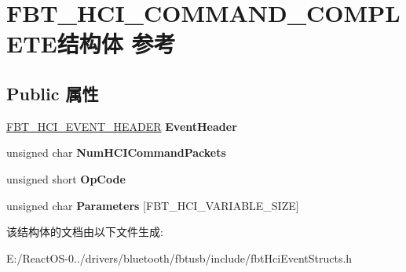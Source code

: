 \hypertarget{struct_f_b_t___h_c_i___c_o_m_m_a_n_d___c_o_m_p_l_e_t_e}{}\section{F\+B\+T\+\_\+\+H\+C\+I\+\_\+\+C\+O\+M\+M\+A\+N\+D\+\_\+\+C\+O\+M\+P\+L\+E\+T\+E结构体 参考}
\label{struct_f_b_t___h_c_i___c_o_m_m_a_n_d___c_o_m_p_l_e_t_e}
\subsection*{Public 属性}
\begin{DoxyCompactItemize}
\item 
\mbox{\label{struct_f_b_t___h_c_i___c_o_m_m_a_n_d___c_o_m_p_l_e_t_e_a8bbf0e61a94f0b66b2d0261f4037bb1c}} 
\hyperlink{struct_f_b_t___h_c_i___e_v_e_n_t___h_e_a_d_e_r}{F\+B\+T\+\_\+\+H\+C\+I\+\_\+\+E\+V\+E\+N\+T\+\_\+\+H\+E\+A\+D\+ER} {\bfseries Event\+Header}
\item 
\mbox{\label{struct_f_b_t___h_c_i___c_o_m_m_a_n_d___c_o_m_p_l_e_t_e_aa34446828f9c61fc7c75943a0e793cd1}} 
unsigned char {\bfseries Num\+H\+C\+I\+Command\+Packets}
\item 
\mbox{\label{struct_f_b_t___h_c_i___c_o_m_m_a_n_d___c_o_m_p_l_e_t_e_a2e4a422317a9ccf7fa31e3ec8ac21aac}} 
unsigned short {\bfseries Op\+Code}
\item 
\mbox{\label{struct_f_b_t___h_c_i___c_o_m_m_a_n_d___c_o_m_p_l_e_t_e_a97bb9add4a1ee97e81f9b61330a08a72}} 
unsigned char {\bfseries Parameters} \mbox{[}F\+B\+T\+\_\+\+H\+C\+I\+\_\+\+V\+A\+R\+I\+A\+B\+L\+E\+\_\+\+S\+I\+ZE\mbox{]}
\end{DoxyCompactItemize}


该结构体的文档由以下文件生成\+:\begin{DoxyCompactItemize}
\item 
E\+:/\+React\+O\+S-\/0../drivers/bluetooth/fbtusb/include/fbt\+Hci\+Event\+Structs.\+h\end{DoxyCompactItemize}
